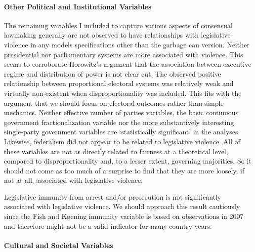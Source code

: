 \documentclass[a4paper]{article}\usepackage{graphicx, color}
\begin{document}
\paragraph{Other Political and Institutional Variables}
The remaining variables I included to capture various aspects of consensual lawmaking generally are not observed to have relationships with legislative violence in any models specifications other than the garbage can version.  Neither presidential nor parliamentary systems are more associated with violence. This seems to corroborate Horowitz's \citeyearpar{Horowitz1990} argument that the association between executive regime and distribution of power is not clear cut. The observed positive relationship between proportional electoral systems was relatively weak and virtually non-existent when disproportionality was included. This fits with the argument that we should focus on electoral outcomes rather than simple mechanics. Neither effective number of parties variables, the basic continuous government fractionalization variable nor the more substantively interesting single-party government variables are `statistically significant' in the analyses. Likewise, federalism did not appear to be related to legislative violence. All of these variables are not as directly related to fairness at a theoretical level, compared to disproportionality and, to a lesser extent, governing majorities. So it should not come as too much of a surprise to find that they are more loosely, if not at all, associated with legislative violence.

Legislative immunity from arrest and/or prosecution is not significantly associated with legislative violence. We should approach this result cautiously since the Fish and Koening immunity variable is based on observations in 2007 and therefore might not be a valid indicator for many country-years.

\paragraph{Cultural and Societal Variables}
\end{document}
